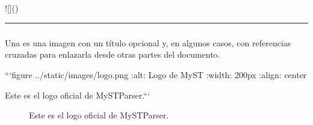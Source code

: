 \documentclass[a4paper,10pt,spanish]{sphinxmanual}
\let\sphinxpxdimen\pdfpxdimen\else\newdimen\sphinxpxdimen
\begin{document}
\subparagraph{}
\label{\detokenize{configuracion_inicial/013.guia_de_myst_parser:ejemplo}}
\begin{sphinxVerbatim}[commandchars=\\\{\}]
![]()
\end{sphinxVerbatim}

\sphinxAtStartPar
{}

\sphinxAtStartPar
{}


\bigskip\hrule\bigskip



\subsubsection{}
\label{\detokenize{configuracion_inicial/013.guia_de_myst_parser:figuras-con-titulo-y-referencia}}

\paragraph{}
\label{\detokenize{configuracion_inicial/013.guia_de_myst_parser:insertar-una-figura-con-titulo}}
\sphinxAtStartPar
Una  es una imagen con un título opcional y, en algunos casos, con referencias cruzadas para enlazarla desde otras partes del documento.

\begin{sphinxVerbatim}[commandchars=\\\{\}]
  ```\PYGZob{}figure\PYGZcb{} ../\PYGZus{}static/images/logo.png
  :alt: Logo de MyST
  :width: 200px
  :align: center

  Este es el logo oficial de MyST\PYGZhy{}Parser.```
\end{sphinxVerbatim}

\sphinxAtStartPar
{}

\begin{figure}[htbp]
\centering
\capstart

\noindent\sphinxincludegraphics[width=200\sphinxpxdimen]{{logo}.png}
\caption{Este es el logo oficial de MyST\sphinxhyphen{}Parser.}\label{\detokenize{configuracion_inicial/013.guia_de_myst_parser:fig-logo}}\end{figure}
\end{document}
